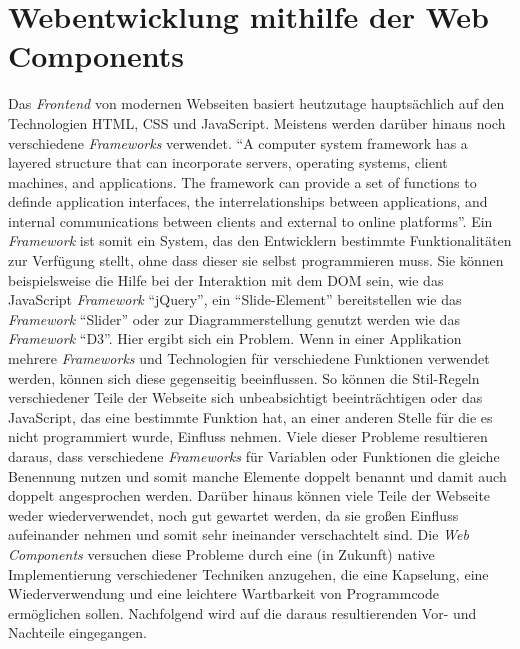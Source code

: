 \documentclass[12pt, paper=a4, bibtotoc, toc=listof, headsepline=true]{scrreprt}
\begin{document}
		\section{Webentwicklung mithilfe der Web Components}
		Das \emph{Frontend} von modernen Webseiten basiert heutzutage hauptsächlich auf den Technologien \ac{HTML}, \ac{CSS} und JavaScript. Meistens werden darüber hinaus noch verschiedene \emph{Frameworks} verwendet. \enquote{A computer system framework has a layered structure that can incorporate servers, operating systems, client machines, and applications. The framework can provide a set of functions to definde application interfaces, the interrelationships between applications, and internal communications between clients and external to online platforms}\cite[S.15]{stuart2013roadmap}. Ein \emph{Framework} ist somit ein System, das den Entwicklern bestimmte Funktionalitäten zur Verfügung stellt, ohne dass dieser sie selbst programmieren muss. Sie können beispielsweise die Hilfe bei der Interaktion mit dem \ac{DOM} sein, wie das JavaScript \emph{Framework} \enquote{jQuery}, ein \enquote{Slide-Element} bereitstellen wie das \emph{Framework} \enquote{Slider} oder zur Diagrammerstellung genutzt werden wie das \emph{Framework} \enquote{D3}. Hier ergibt sich ein Problem. Wenn in einer Applikation mehrere \emph{Frameworks} und Technologien für verschiedene Funktionen verwendet werden, können sich diese gegenseitig beeinflussen. So können die Stil-Regeln verschiedener Teile der Webseite sich unbeabsichtigt beeinträchtigen oder das JavaScript, das eine bestimmte Funktion hat, an einer anderen Stelle für die es nicht programmiert wurde, Einfluss nehmen. Viele dieser Probleme resultieren daraus, dass verschiedene \emph{Frameworks} für Variablen oder Funktionen die gleiche Benennung nutzen und somit manche Elemente doppelt benannt und damit auch doppelt angesprochen werden. Darüber hinaus können viele Teile der Webseite weder wiederverwendet, noch gut gewartet werden, da sie großen Einfluss aufeinander nehmen und somit sehr ineinander verschachtelt sind.
		Die \emph{Web Components} versuchen diese Probleme durch eine (in Zukunft) native Implementierung verschiedener Techniken anzugehen, die eine Kapselung, eine Wiederverwendung und eine leichtere Wartbarkeit von Programmcode ermöglichen sollen. Nachfolgend wird auf die daraus resultierenden Vor- und Nachteile eingegangen. 			
\end{document}

